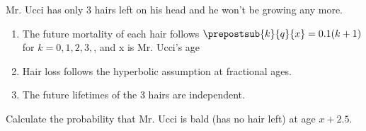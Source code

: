 Mr. Ucci has only 3 hairs left on his head and he won't be growing any more.
\begin{enumerate}
\item The future mortality of each hair follows
  $\prepostsub{k}{q}{x} = 0.1(k +1)$ for $k = 0, 1, 2, 3,$, and x is Mr. Ucci's age
\item Hair loss follows the hyperbolic assumption at fractional ages.
\item The future lifetimes of the 3 hairs are independent.
\end{enumerate}
Calculate the probability that 
Mr. Ucci is bald (has no hair left) at age $x + 2.5 .$
